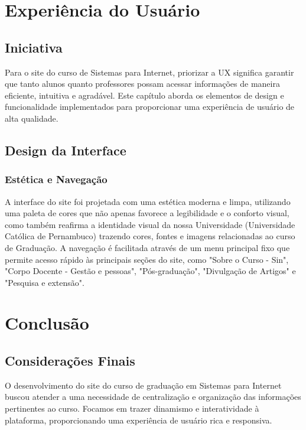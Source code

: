 \documentclass[a4paper,12pt]{report}
\begin{document}
\chapter{Experiência do Usuário}
 
\section{Iniciativa}
 
Para o site do curso de Sistemas para Internet, priorizar a UX significa garantir que tanto alunos quanto professores possam acessar informações de maneira eficiente, intuitiva e agradável. Este capítulo aborda os elementos de design e funcionalidade implementados para proporcionar uma experiência de usuário de alta qualidade.
 
\section{Design da Interface} 
\subsection{Estética e Navegação}
 
A interface do site foi projetada com uma estética moderna e limpa, utilizando uma paleta de cores que não apenas favorece a legibilidade e o conforto visual, como também reafirma a identidade visual da nossa Universidade (Universidade Católica de Pernambuco) trazendo cores, fontes e imagens relacionadas ao curso de Graduação. A navegação é facilitada através de um menu principal fixo que permite acesso rápido às principais seções do site, como "Sobre o Curso - Sin", "Corpo Docente - Gestão e pessoas", "Pós-graduação", "Divulgação de Artigos" e "Pesquisa e extensão".

\chapter{Conclusão} 

\section{Considerações Finais} 

O desenvolvimento do site do curso de graduação em Sistemas para Internet buscou atender a uma necessidade de centralização e organização das informações pertinentes ao curso. Focamos em trazer dinamismo e interatividade à plataforma, proporcionando uma experiência de usuário rica e responsiva. 
\end{document}
